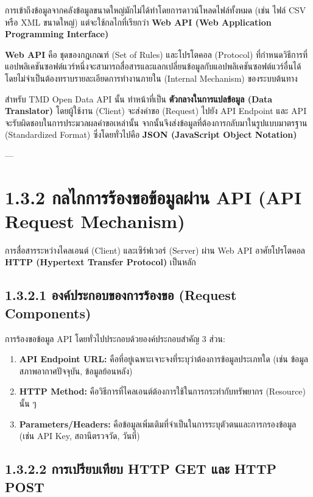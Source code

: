 \documentclass[11pt,a4paper,openany]{report}
\begin{document}
การเข้าถึงข้อมูลจากคลังข้อมูลขนาดใหญ่มักไม่ได้ทำโดยการดาวน์โหลดไฟล์ทั้งหมด (เช่น ไฟล์ CSV หรือ XML ขนาดใหญ่) แต่จะใช้กลไกที่เรียกว่า \textbf{Web API (Web Application Programming Interface)}

\textbf{Web API} คือ ชุดของกฎเกณฑ์ (Set of Rules) และโปรโตคอล (Protocol) ที่กำหนดวิธีการที่แอปพลิเคชันซอฟต์แวร์หนึ่งจะสามารถสื่อสารและแลกเปลี่ยนข้อมูลกับแอปพลิเคชันซอฟต์แวร์อื่นได้โดยไม่จำเป็นต้องทราบรายละเอียดการทำงานภายใน (Internal Mechanism) ของระบบต้นทาง

สำหรับ TMD Open Data API นั้น ทำหน้าที่เป็น \textbf{ตัวกลางในการแปลข้อมูล (Data Translator)} โดยผู้ใช้งาน (Client) จะส่งคำขอ (Request) ไปยัง API Endpoint และ API จะรับผิดชอบในการประมวลผลคำขอเหล่านั้น จากนั้นจึงส่งข้อมูลที่ต้องการกลับมาในรูปแบบมาตรฐาน (Standardized Format) ซึ่งโดยทั่วไปคือ \textbf{JSON (JavaScript Object Notation)}

---

\section{1.3.2 กลไกการร้องขอข้อมูลผ่าน API (API Request Mechanism)}


การสื่อสารระหว่างไคลเอนต์ (Client) และเซิร์ฟเวอร์ (Server) ผ่าน Web API อาศัยโปรโตคอล \textbf{HTTP (Hypertext Transfer Protocol)} เป็นหลัก

\subsection{1.3.2.1 องค์ประกอบของการร้องขอ (Request Components)}


การร้องขอข้อมูล API โดยทั่วไปประกอบด้วยองค์ประกอบสำคัญ 3 ส่วน:

\begin{enumerate}
  \item \textbf{API Endpoint URL:} คือที่อยู่เฉพาะเจาะจงที่ระบุว่าต้องการข้อมูลประเภทใด (เช่น ข้อมูลสภาพอากาศปัจจุบัน, ข้อมูลย้อนหลัง)
  \item \textbf{HTTP Method:} คือวิธีการที่ไคลเอนต์ต้องการใช้ในการกระทำกับทรัพยากร (Resource) นั้น ๆ
  \item \textbf{Parameters/Headers:} คือข้อมูลเพิ่มเติมที่จำเป็นในการระบุตัวตนและการกรองข้อมูล (เช่น API Key, สถานีตรวจวัด, วันที่)
\end{enumerate}


\subsection{1.3.2.2 การเปรียบเทียบ HTTP GET และ HTTP POST}
\end{document}
